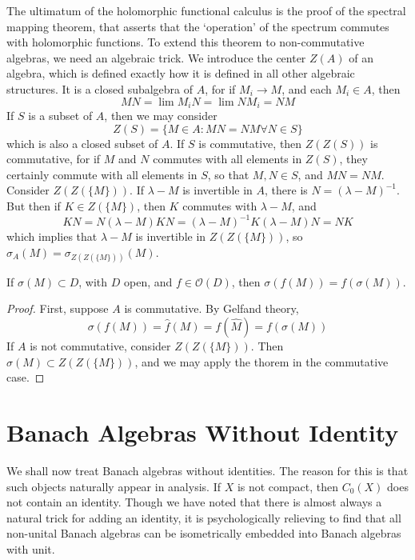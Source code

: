 The ultimatum of the holomorphic functional calculus is the proof of the spectral mapping theorem, that asserts that the `operation' of the spectrum commutes with holomorphic functions. To extend this theorem to non-commutative algebras, we need an algebraic trick. We introduce the center $Z(A)$ of an algebra, which is defined exactly how it is defined in all other algebraic structures. It is a closed subalgebra of $A$, for if $M_i \to M$, and each $M_i \in A$, then
%
\[ MN = \lim M_iN = \lim NM_i = NM \]
%
If $S$ is a subset of $A$, then we may consider
%
\[ Z(S) = \{ M \in A : MN = NM \forall N \in S \} \]
%
which is also a closed subset of $A$. If $S$ is commutative, then $Z(Z(S))$ is commutative, for if $M$ and $N$ commutes with all elements in $Z(S)$, they certainly commute with all elements in $S$, so that $M,N \in S$, and $MN = NM$. Consider $Z(Z(\{ M \}))$. If $\lambda - M$ is invertible in $A$, there is $N = (\lambda - M)^{-1}$. But then if $K \in Z(\{ M \})$, then $K$ commutes with $\lambda - M$, and
%
\[ KN = N(\lambda - M) K N = (\lambda - M)^{-1} K (\lambda - M) N = NK \]
%
which implies that $\lambda - M$ is invertible in $Z(Z(\{M\}))$, so $\sigma_A(M) = \sigma_{Z(Z(\{M\}))}(M)$.

\begin{theorem}
    If $\sigma(M) \subset D$, with $D$ open, and $f \in \mathcal{O}(D)$, then $\sigma(f(M)) = f(\sigma(M))$.
\end{theorem}
\begin{proof}
    First, suppose $A$ is commutative. By Gelfand theory,
    \[ \sigma(f(M)) = \widehat{f}(M) = f(\widehat{M}) = f(\sigma(M)) \]
    If $A$ is not commutative, consider $Z(Z(\{M\}))$. Then $\sigma(M) \subset Z(Z(\{M\}))$, and we may apply the thorem in the commutative case.
\end{proof}





\section{Banach Algebras Without Identity}

We shall now treat Banach algebras without identities. The reason for this is that such objects naturally appear in analysis. If $X$ is not compact, then $C_0(X)$ does not contain an identity. Though we have noted that there is almost always a natural trick for adding an identity, it is psychologically relieving to find that all non-unital Banach algebras can be isometrically embedded into Banach algebras with unit.

